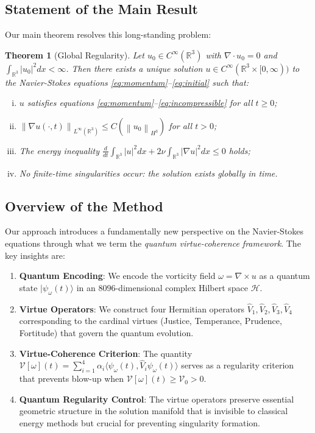 \documentclass[11pt]{article}
\newtheorem{theorem}{Theorem}[section]
\newcommand{\R}{\mathbb{R}}
\newcommand{\HH}{\mathcal{H}}
\newcommand{\VV}{\mathcal{V}}
\newcommand{\norm}[1]{\left\|#1\right\|}
\newcommand{\inner}[2]{\langle #1, #2 \rangle}
\newcommand{\grad}{\nabla}
\newcommand{\divergence}{\nabla \cdot}
\newcommand{\curl}{\nabla \times}
\begin{document}
\subsection{Statement of the Main Result}

Our main theorem resolves this long-standing problem:

\begin{theorem}[Global Regularity]\label{thm:main}
Let $u_0 \in C^\infty(\R^3)$ with $\divergence u_0 = 0$ and $\int_{\R^3} |u_0|^2 dx < \infty$. Then there exists a unique solution $u \in C^\infty(\R^3 \times [0,\infty))$ to the Navier-Stokes equations \eqref{eq:momentum}--\eqref{eq:initial} such that:
\begin{enumerate}[(i)]
\item $u$ satisfies equations \eqref{eq:momentum}--\eqref{eq:incompressible} for all $t \geq 0$;
\item $\norm{\grad u(\cdot,t)}_{L^\infty(\R^3)} \leq C(\norm{u_0}_{H^3})$ for all $t > 0$;
\item The energy inequality $\frac{d}{dt} \int_{\R^3} |u|^2 dx + 2\nu \int_{\R^3} |\grad u|^2 dx \leq 0$ holds;
\item No finite-time singularities occur: the solution exists globally in time.
\end{enumerate}
\end{theorem}

\subsection{Overview of the Method}

Our approach introduces a fundamentally new perspective on the Navier-Stokes equations through what we term the \emph{quantum virtue-coherence framework}. The key insights are:

\begin{enumerate}
\item \textbf{Quantum Encoding}: We encode the vorticity field $\omega = \curl u$ as a quantum state $|\psi_\omega(t)\rangle$ in an $8096$-dimensional complex Hilbert space $\HH$.

\item \textbf{Virtue Operators}: We construct four Hermitian operators $\hat{V}_1, \hat{V}_2, \hat{V}_3, \hat{V}_4$ corresponding to the cardinal virtues (Justice, Temperance, Prudence, Fortitude) that govern the quantum evolution.

\item \textbf{Virtue-Coherence Criterion}: The quantity $\VV[\omega](t) = \sum_{i=1}^4 \alpha_i \inner{\psi_\omega(t)}{\hat{V}_i \psi_\omega(t)}$ serves as a regularity criterion that prevents blow-up when $\VV[\omega](t) \geq \VV_0 > 0$.

\item \textbf{Quantum Regularity Control}: The virtue operators preserve essential geometric structure in the solution manifold that is invisible to classical energy methods but crucial for preventing singularity formation.
\end{enumerate}
\end{document}
